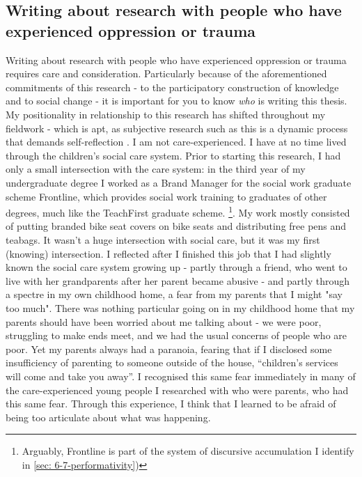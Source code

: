 \subsection{Writing about research with people who have experienced oppression or trauma}
Writing about research with people who have experienced oppression or trauma requires care and consideration. Particularly because of the aforementioned commitments of this research - to the participatory construction of knowledge and to social change - it is important for you to know \emph{who} is writing this thesis. My positionality in relationship to this research has shifted throughout my fieldwork - which is apt, as subjective research such as this is a dynamic process that demands self-reflection \citep{rose_situating_1997}. I am not care-experienced. I have at no time lived through the children’s social care system. Prior to starting this research, I had only a small intersection with the care system: in the third year of my undergraduate degree I worked as a Brand Manager for the social work graduate scheme Frontline, which provides social work training to graduates of other degrees, much like the TeachFirst graduate scheme. \footnote{Arguably, Frontline is part of the system of discursive accumulation I identify in \ref{sec: 6-7-performativity})}. My work mostly consisted of putting branded bike seat covers on bike seats and distributing free pens and teabags. It wasn’t a huge intersection with social care, but it was my first (knowing) intersection. I reflected after I finished this job that I had slightly known the social care system growing up - partly through a friend, who went to live with her grandparents after her parent became abusive - and partly through a spectre in my own childhood home, a fear from my parents that I might "say too much". There was nothing particular going on in my childhood home that my parents should have been worried about me talking about - we were poor, struggling to make ends meet, and we had the usual concerns of people who are poor. Yet my parents always had a paranoia, fearing that if I disclosed some insufficiency of parenting to someone outside of the house, “children’s services will come and take you away”. I recognised this same fear immediately in many of the care-experienced young people I researched with who were parents, who had this same fear. Through this experience, I think that I learned to be afraid of being too articulate about what was happening.

